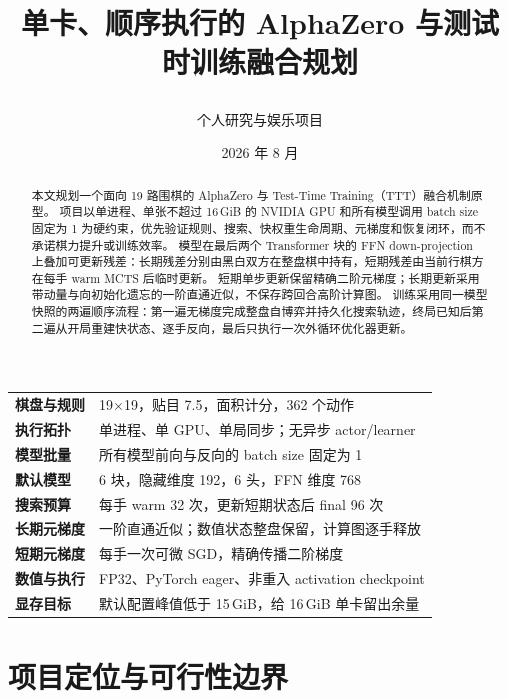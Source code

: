 \documentclass[UTF8,11pt,a4paper]{ctexart}
\title{\textbf{\Huge \projectname}\par
  \vspace{0.6em}
  \Large 单卡、顺序执行的 AlphaZero 与测试时训练融合规划}
\author{个人研究与娱乐项目}
\date{2026 年 8 月}
\begin{document}
\maketitle
\thispagestyle{empty}

\begin{abstract}
本文规划一个面向 19 路围棋的 AlphaZero 与 Test-Time Training（TTT）融合机制原型。
项目以单进程、单张不超过 16\,GiB 的 NVIDIA GPU 和所有模型调用 batch size 固定为 1 为硬约束，优先验证规则、搜索、快权重生命周期、元梯度和恢复闭环，而不承诺棋力提升或训练效率。
模型在最后两个 Transformer 块的 FFN down-projection 上叠加可更新残差：长期残差分别由黑白双方在整盘棋中持有，短期残差由当前行棋方在每手 warm MCTS 后临时更新。
短期单步更新保留精确二阶元梯度；长期更新采用带动量与向初始化遗忘的一阶直通近似，不保存跨回合高阶计算图。
训练采用同一模型快照的两遍顺序流程：第一遍无梯度完成整盘自博弈并持久化搜索轨迹，终局已知后第二遍从开局重建快状态、逐手反向，最后只执行一次外循环优化器更新。
\end{abstract}

\vfill
\begin{center}
\begin{tabularx}{0.94\textwidth}{>{\bfseries\color{Primary}}p{}X}
棋盘与规则 & 19$\times$19，贴目 7.5，面积计分，362 个动作 \\
执行拓扑 & 单进程、单 GPU、单局同步；无异步 actor/learner \\
模型批量 & 所有模型前向与反向的 batch size 固定为 1 \\
默认模型 & 6 块，隐藏维度 192，6 头，FFN 维度 768 \\
搜索预算 & 每手 warm 32 次，更新短期状态后 final 96 次 \\
长期元梯度 & 一阶直通近似；数值状态整盘保留，计算图逐手释放 \\
短期元梯度 & 每手一次可微 SGD，精确传播二阶梯度 \\
数值与执行 & FP32、PyTorch eager、非重入 activation checkpoint \\
显存目标 & 默认配置峰值低于 15\,GiB，给 16\,GiB 单卡留出余量 \\
\end{tabularx}
\end{center}
\vfill
\clearpage

\begingroup
\small
\setlength{\parskip}{0pt}
\tableofcontents
\endgroup
\clearpage

\section{项目定位与可行性边界}
\end{document}
